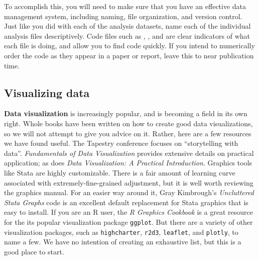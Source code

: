 To accomplish this, you will need to make sure that you have an effective data management system,
including naming, file organization, and version control.
Just like you did with each of the analysis datasets,
name each of the individual analysis files descriptively.
Code files such as ,
, and 
are clear indicators of what each file is doing, and allow you to find code quickly.
If you intend to numerically order the code as they appear in a paper or report,
leave this to near publication time.

\subsection{Visualizing data}

\textbf{Data visualization} 
is increasingly popular, and is becoming a field in its own right.\cite{healy2018data,wilke2019fundamentals}
Whole books have been written on how to create good data visualizations,
so we will not attempt to give you advice on it.
Rather, here are a few resources we have found useful.
The Tapestry conference focuses on ``storytelling with data''.
\textit{Fundamentals of Data Visualization} provides extensive details on practical application;
as does \textit{Data Visualization: A Practical Introduction}.
Graphics tools like Stata are highly customizable.
There is a fair amount of learning curve associated with extremely-fine-grained adjustment,
but it is well worth reviewing the graphics manual.
For an easier way around it, Gray Kimbrough's \textit{Uncluttered Stata Graphs}
code is an excellent default replacement for Stata graphics that is easy to install.
If you are an R user, the \textit{R Graphics Cookbook}
is a great resource for the its popular visualization package \texttt{ggplot}.
But there are a variety of other visualization packages,
such as \texttt{highcharter},
\texttt{r2d3},
\texttt{leaflet},
and \texttt{plotly}, to name a few.
We have no intention of creating an exhaustive list, but this is a good place to start.

